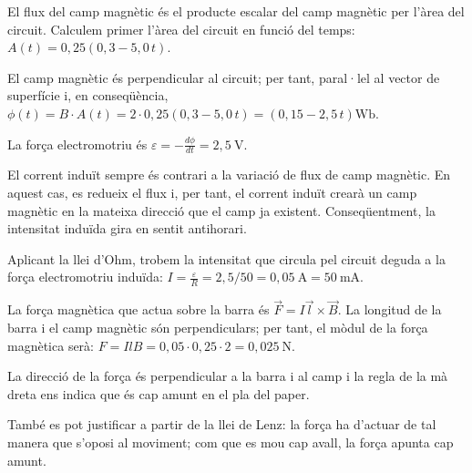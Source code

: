 \begin{solapartat}
 El flux del camp magnètic és el producte escalar del camp magnètic per l'àrea del circuit. Calculem primer l'àrea del circuit en funció del temps: $A(t) = 0,25(0,3 - 5,0\,t)$.

El camp magnètic és perpendicular al circuit; per tant, paral·lel al vector de superfície i, en conseqüència, $\phi(t) = B\cdot A(t) = 2\cdot 0,25(0,3 - 5,0\,t) = (0,15 - 2,5\,t)\mathrm{Wb}$.

 La força electromotriu és $\varepsilon = -\frac{d\phi}{dt} = 2,5\ \mathrm{V}$.

 El corrent induït sempre és contrari a la variació de flux de camp magnètic. En aquest cas, es redueix el flux i, per tant, el corrent induït crearà un camp magnètic en la mateixa direcció que el camp ja existent. Conseqüentment, la intensitat induïda gira en sentit antihorari.

\end{solapartat}

\begin{solapartat}
 Aplicant la llei d'Ohm, trobem la intensitat que circula pel circuit deguda a la força electromotriu induïda: $I = \frac{\varepsilon}{R} = 2,5/50 = 0,05\ \mathrm{A} = 50\ \mathrm{mA}$.

 La força magnètica que actua sobre la barra és $\vec{F} = I\vec{l}\times\vec{B}$. La longitud de la barra i el camp magnètic són perpendiculars; per tant, el mòdul de la força magnètica serà: $F = IlB = 0,05\cdot 0,25\cdot 2 = 0,025\ \mathrm{N}$.

 La direcció de la força és perpendicular a la barra i al camp i la regla de la mà dreta ens indica que és cap amunt en el pla del paper.

També es pot justificar a partir de la llei de Lenz: la força ha d'actuar de tal manera que s'oposi al moviment; com que es mou cap avall, la força apunta cap amunt.

\end{solapartat}
